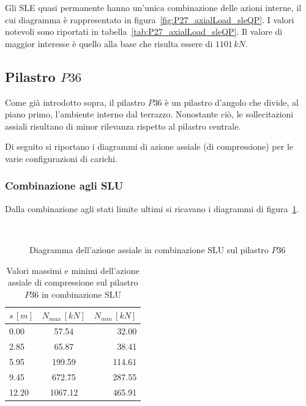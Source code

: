 Gli SLE quasi permanente hanno un'unica combinazione delle azioni interne, il cui diagramma è rappresentato in figura~\ref{fig:P27_axialLoad_sleQP}. I valori notevoli sono riportati in tabella~\ref{tab:P27_axialLoad_sleQP}. Il valore di maggior interesse è quello alla base che risulta essere di $1101\,kN$.
\cleardoublepage
%
%
%
%
\subsection{Pilastro $P36$}
Come già introdotto sopra, il pilastro $P36$ è un pilastro d'angolo che divide, al piano primo, l'ambiente interno dal terrazzo. Nonostante ciò, le sollecitazioni assiali risultano di minor rilevanza rispetto al pilastro centrale.

Di seguito si riportano i diagrammi di azione assiale (di compressione) per le varie configurazioni di carichi.
\subsubsection{Combinazione agli SLU}
Dalla combinazione agli stati limite ultimi si ricavano i diagrammi di figura~\ref{fig:P36_axialLoad_slu}.

\begin{figure}[h!]
	\centering
	\\
	\caption{Diagramma dell'azione assiale in combinazione SLU sul pilastro $P36$}
	\label{fig:P36_axialLoad_slu}
\end{figure}

\begin{table}[h!]
	\centering
	\caption{Valori massimi e minimi dell'azione assiale di compressione sul pilastro $P36$ in combinazione SLU}
	\label{tab:P36_axialLoad_slu}
	\begin{tabular*}{\textwidth}{l @{\extracolsep{\fill}} cr}
		\toprule
		$s\,[m]$ & $N_{max}\,[kN]$ & $N_{min}\,[kN]$ \\
		\midrule
		0.00 &   57.54 &   32.00 \\
		2.85 &   65.87 &   38.41 \\
		5.95 &   199.59 &   114.61 \\
		9.45 &  672.75 &   287.55 \\
		12.20 &  1067.12 &   465.91 \\
		\bottomrule
	\end{tabular*}
\end{table}
\cleardoublepage
